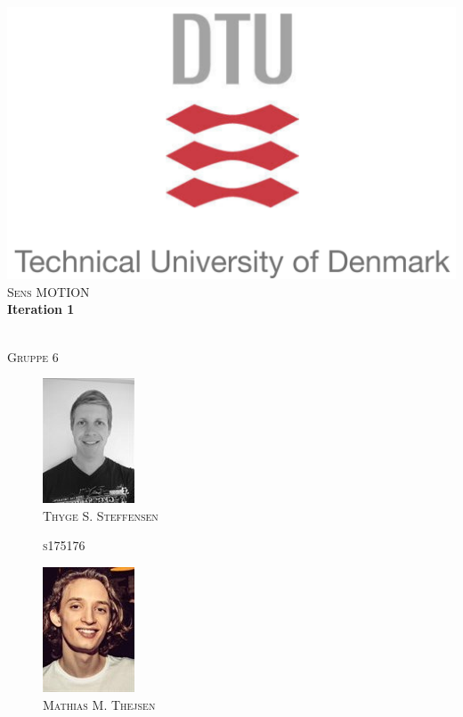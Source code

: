 \begin{titlepage}
\begin{center}

\includegraphics{../Pictures/frontpage/dtu-logo.png}\\[0.5cm]
\textsc{\Large Sens MOTION } \\%

\HRule 
{ \huge \bfseries Iteration 1 \\[0.1cm] } %

\HRule \\[0.8cm]
\textsc{Gruppe 6}
\begin{multicols}{4}
\columnbreak
    \begin{figure}[H]
        \centering
        \includegraphics[scale=0.6]{../Pictures/frontpage/Thyge.png}\\
        \textsc{Thyge S. Steffensen}
        
        \textsc{s175176}\\
        \hfill \break
        \hfill \break
    \end{figure}
\columnbreak
    \begin{figure}[H]
        \centering
        \includegraphics[scale=0.8]{../Pictures/frontpage/mathias.png}\\
        \textsc{Mathias M. Thejsen}
        

\end{figure}
\end{multicols}
\end{center}
\end{titlepage}
